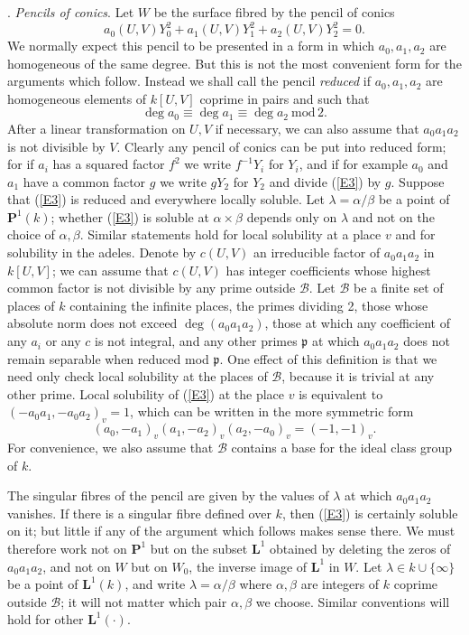 \documentclass[12pt]{article}
\def\bL{{\mathbf L}}
\def\bP{{\mathbf P}}
\def\fp{{\mathfrak p}}
\def\ga{{\alpha}}
\def\gb{{\beta}}
\def\gl{{\lambda}}
\def\sB{{\mathcal B}}
\def\beq{\begin{equation} \label}
\begin{document}
. \emph{Pencils of conics}. \newline
Let $W$ be the surface fibred by the pencil of conics
\beq{E3} a_0(U,V)Y_0^2+a_1(U,V)Y_1^2+a_2(U,V)Y_2^2=0. \end{equation}
We normally expect this pencil to be presented in a form in which $a_0,a_1,a_2$
are homogeneous of the same degree. But this is not the most convenient form
for the arguments which follow. Instead we shall call the pencil
\emph{reduced} if $a_0,a_1,a_2$ are homogeneous elements of $k[U,V]$ coprime
in pairs and such that
\[ \deg a_0\equiv\deg a_1\equiv\deg a_2 {\mathrm{~mod}}\,2. \]
After a linear transformation on $U,V$ if necessary, we can also assume that
$a_0a_1a_2$ is not divisible by $V$.
Clearly any pencil of conics can be put into reduced form; for if $a_i$ has a
squared factor $f^2$ we write $f^{-1}Y_i$ for $Y_i$, and if for example $a_0$
and $a_1$ have a common factor $g$ we write $gY_2$ for $Y_2$ and divide
(\ref{E3}) by $g$. Suppose that
(\ref{E3}) is reduced and everywhere locally soluble. Let
$\gl=\ga/\gb$ be a point of $\bP^1(k)$; whether (\ref{E3})
is soluble at $\ga\times
\gb$ depends only on $\gl$ and not on the choice of $\ga,\gb$. Similar
statements hold for local solubility at a place $v$ and for solubility in the
adeles. Denote by $c(U,V)$ an irreducible factor of $a_0a_1a_2$ in
$k[U,V]$; we can assume that $c(U,V)$ has integer coefficients
whose highest common factor is not divisible by any prime
outside $\sB$. Let $\sB$
be a finite set of places of $k$ containing the infinite places, the primes
dividing 2, those whose absolute norm does not exceed $\deg(a_0a_1a_2)$,
those at which any coefficient of any $a_i$ or any $c$ is not integral,
and any other primes $\fp$ at which $a_0a_1a_2$ does not remain separable when
reduced mod $\fp$. One effect of this definition is that we need only check
local solubility at the places of $\sB$, because it is trivial at any other
prime. Local solubility of (\ref{E3}) at the place $v$ is
equivalent to $(-a_0a_1,-a_0a_2)_v=1$, which can be written in
the more symmetric form
\beq{E78} (a_0,-a_1)_v(a_1,-a_2)_v(a_2,-a_0)_v=(-1,-1)_v.
\end{equation}
For convenience, we also assume that $\sB$ contains a base
for the ideal class group of $k$.

The singular fibres of the pencil are given by the values of $\gl$ at which
$a_0a_1a_2$ vanishes. If there is a singular fibre defined over $k$, then
(\ref{E3}) is certainly soluble on it; but little if any of the argument
which follows makes sense there. We must therefore work not on $\bP^1$ but
on the subset $\bL^1$ obtained by deleting the zeros of $a_0a_1a_2$, and not
on $W$ but on $W_0$, the inverse image of $\bL^1$ in $W$.
Let $\gl\in k\cup\{\infty\}$ be a point of
$\bL^1(k)$, and write $\gl=\ga/\gb$ where $\ga,\gb$ are integers of $k$
coprime outside $\sB$; it will not matter which pair
$\ga,\gb$ we choose. Similar conventions will hold for other $\bL^1(\cdot)$.
\end{document}
